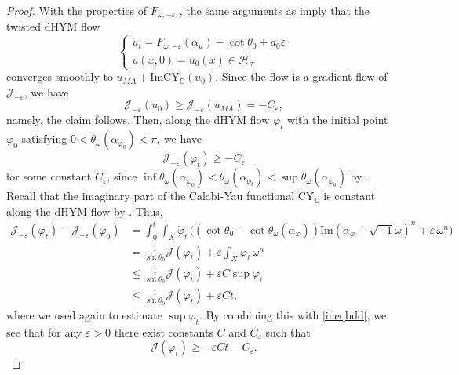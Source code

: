 \documentclass{amsart}
\numberwithin{equation}{section}
\theoremstyle{plain}
\theoremstyle{definition}
\theoremstyle{remark}
\begin{document}
\begin{proof}
    With the properties of $F_{\omega,-\varepsilon}$ \cite[Lemma 5.6]{GChen}, the same arguments as \cite[Section 4.2]{CL} imply that the twisted dHYM flow
    \begin{equation}\label{eqtdHYMflow}
        \begin{cases}
        \dot{u}_t=F_{\omega,-\varepsilon}(\alpha_u)-\cot{\theta_0}+a_0\varepsilon \\ u(x,0)=u_0(x)\in \mathcal{H}_\pi
        \end{cases}
    \end{equation}
    converges smoothly to $u_{MA}+\mathrm{Im}\mathrm{CY}_\mathbb{C}(u_0)$. Since the flow is a gradient flow of $\mathcal{J}_{-\varepsilon}$, we have
    $$\mathcal{J}_{-\varepsilon}(u_0)\ge\mathcal{J}_{-\varepsilon}(u_{MA})=-C_\varepsilon,$$
    namely, the claim follows.
    Then, along the dHYM flow $\varphi_t$ with the initial point $\varphi_0$ satisfying $0<\theta_\omega(\alpha_{\varphi_0}) < \pi$, we have
    \begin{equation}\label{ineqbdd}
        \mathcal{J}_{-\varepsilon}(\varphi_t)\ge - C_\varepsilon
    \end{equation}
    for some constant $C_\varepsilon$, since 
    $\inf\theta_\omega(\alpha_{\varphi_0})<\theta_\omega(\alpha_{\phi_t})<\sup\theta_\omega(\alpha_{\varphi_0})$
    by \cite[Lemma 3.2]{FYZ}. Recall that the imaginary part of the Calabi-Yau functional $\mathrm{CY}_\mathbb{C}$ 
    is constant along the dHYM flow by \cite[Lemma 2.7]{FYZ}. Thus,
    \begin{align*}
        \mathcal{J}_{-\varepsilon}(\varphi_t)-\mathcal{J}_{-\varepsilon}(\varphi_0)
        &=\int^t_0\int_X \dot{\varphi}_t \, \biggl( (\cot{\theta_0}-\cot{\theta_\omega(\alpha_\varphi)})\mathrm{Im}(\alpha_\varphi+\sqrt{-1}\omega)^n+\varepsilon\, \omega^n\biggr)\\
        &=\frac{1}{\sin{\theta_0}}\mathcal{J}(\varphi_t)+\varepsilon\int_X\varphi_t\, \omega^n\\
        &\le\frac{1}{\sin{\theta_0}}\mathcal{J}(\varphi_t)+\varepsilon C\sup\varphi_t\\
        &\le\frac{1}{\sin{\theta_0}}\mathcal{J}(\varphi_t)+\varepsilon C t,
    \end{align*}
    where we used \cite[Lemma 3.2]{FYZ} again to estimate $\sup\varphi_t$.
    By combining this with \eqref{ineqbdd}, we see that for any $\varepsilon>0$ there exist constants $C$ and $C_\varepsilon$ such that
    \begin{equation}\label{ineqdhymslope}
        \mathcal{J}(\varphi_t)\ge -\varepsilon C t-C_\varepsilon.

\end{equation}
\end{proof}
\end{document}
